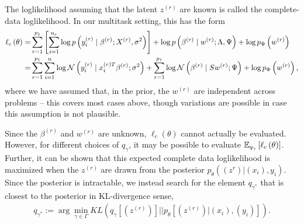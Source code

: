 \documentclass[14pt]{extarticle}
\begin{document}
The loglikelihood assuming that the latent $z^{(r)}$ are known is called the
complete-data loglikelihood. In our multitask setting, this has the form
\begin{align*}
  \ell_{c}\left(\theta\right) = &\sum_{r = 1}^{p_{1}}\left[\sum_{i = 1}^{n_{r}} \log p\left(y_{i}^{(r)} \mid \beta^{(r)} ; X^{(r)}, \sigma^{2}\right)\right] + \log p\left(\beta^{(r)} \mid w^{(r)}; \Lambda, \Psi\right) + \log p_{\Phi}\left(w^{(r)}\right) \\
  = &\sum_{r = 1}^{p_{1}}\sum_{i = 1}^{n} \log \mathcal{N}\left(y_{i}^{(r)} \mid x_{i}^{(r) T}\beta^{(r)}; \sigma^{2}\right) + \sum_{r = 1}^{p_{1}}\log \mathcal{N}\left(\beta^{(r)} \mid S w^{(r)}; \Psi\right) + \log p_{\Phi}\left(w^{(r)}\right),
\end{align*}
where we have assumed that, in the prior, the $w^{(r)}$ are independent across
problems -- this covers most cases above, though variations are possible in case
this assumption is not plausible.

Since the $\beta^{(r)}$ and $w^{(r)}$ are unknown, $\ell_{c}\left(\theta\right)$
cannot actually be evaluated. However, for different choices of $q_{\gamma}$, it
may be possible to evaluate $\mathbb{E}_{q_{\gamma}}\left[{\ell_{c}\left(\theta\right)}\right]$.
Further, it can be shown that this expected complete data loglikelihood is
maximized when the $z^{(r)}$ are drawn from the posterior
$p_{\theta}\left(\left(z^{r}\right) \vert \left(x_{i}\right), y_{i}\right)$.
Since the posterior is intractable, we instead search for the element
$q_{\gamma^{\ast}}$ that is closest to the posterior in KL-divergence sense,
\begin{align*}
q_{\gamma^{\ast}}:= \arg\min_{\gamma \in \Gamma} KL\left(q_{\gamma}\left[\left(z^{(r)}\right)\right] \vert \vert
p_{\theta}\left[\left(z^{(r)}\right) \vert \left(x_{i}\right), \left(y_{i}\right)\right]\right).
\end{align*}
\end{document}
